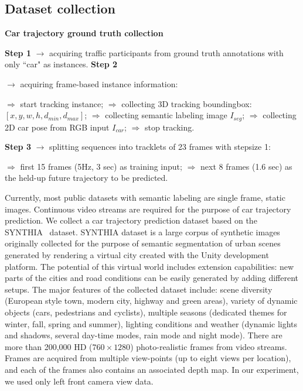 \documentclass[10pt,twocolumn,letterpaper]{article}
\newlength\myindent
\newcommand\bindent[1][\myindent]{%
  \begingroup
  \setlength{\itemindent}{#1}
  \addtolength{\algorithmicindent}{#1}
}
\newcommand\eindent{\endgroup}
\begin{document}
\subsection{Dataset collection}
\begin{algorithm}[h]
\begin{algorithmic}
\caption{\textbf{Car trajectory ground truth collection}}\label{list:dataset_collection}
\STATE \textbf{Step 1} $\rightarrow $ acquiring traffic participants from ground truth annotations with only ``car" as instances.
\STATE \textbf{Step 2} {$\rightarrow $ acquiring frame-based instance information:
{
\bindent
    \STATE $\Rightarrow$ start tracking instance;
    \STATE $\Rightarrow$ collecting 3D tracking boundingbox: $[x, y, w, h, d_{min}, d_{max}]$;
    \STATE $\Rightarrow$ collecting semantic labeling image $I_{seg}$;
    \STATE $\Rightarrow$ collecting 2D car pose from RGB input $I_{car}$;
    \STATE $\Rightarrow$ stop tracking.
    \ENDIF\eindent}
  }
\STATE \textbf{Step 3} $\rightarrow $ splitting sequences into tracklets of 23 frames with stepsize 1:
{\bindent
    \STATE $\Rightarrow$  first 15 frames (5Hz, 3 sec) as training input;
  \STATE $\Rightarrow$  next 8 frames (1.6 sec) as the held-up future trajectory to be predicted.
  \eindent}

\end{algorithmic}
\end{algorithm}

Currently, most public datasets with semantic labeling are single frame, static images. Continuous video streams are required for the purpose of car trajectory prediction.
We collect a car trajectory prediction dataset based on the SYNTHIA~\cite{ros2016synthia} dataset.
SYNTHIA dataset is a large corpus of synthetic images originally collected for the purpose of semantic segmentation of urban scenes generated by rendering a virtual city created with the Unity development platform.
The potential of this virtual world includes extension capabilities: new parts of the cities and road conditions can be easily generated by adding different setups. The major features of the collected dataset include: scene diversity (European style town, modern city, highway and green areas), variety of dynamic objects (cars, pedestrians and cyclists), multiple seasons (dedicated themes for winter, fall, spring and summer), lighting conditions and weather (dynamic lights and shadows, several day-time modes, rain mode and night mode).
There are more than 200,000 HD ($760\times1280$) photo-realistic frames from video streams.
Frames are acquired from multiple view-points (up to eight views per location), and each of the frames also contains an associated depth map. In our experiment, we used only left front camera view data.
\end{document}
